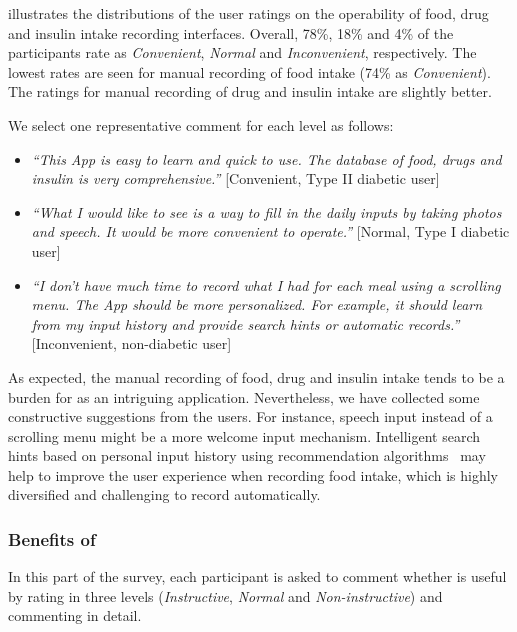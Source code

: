 { illustrates the distributions of the user ratings on the operability of food, drug and insulin intake recording interfaces.
Overall, 78\%, 18\% and 4\% of the participants rate \sysname as \textit{Convenient}, \textit{Normal} and \textit{Inconvenient}, respectively.
The lowest rates are seen for manual recording of food intake (74\% as \textit{Convenient}).
The ratings for manual recording of drug and insulin intake are slightly better.

We select one representative comment for each level as follows:
\begin{itemize}
  \item
  \textit{``This App is easy to learn and quick to use.
  The database of food, drugs and insulin is very comprehensive.''}
  [Convenient, Type II diabetic user]
  \item
  \textit{``What I would like to see is a way to fill in the daily inputs by taking photos and speech.
  It would be more convenient to operate.''}
  [Normal, Type I diabetic user]
  \item
  \textit{``I don't have much time to record what I had for each meal using a scrolling menu.
  The App should be more personalized.
  For example, it should learn from my input history and provide search hints or automatic records.''}
  [Inconvenient, non-diabetic user]
\end{itemize}

As expected, the manual recording of food, drug and insulin intake tends to be a burden for \sysname as an intriguing application.
Nevertheless, we have collected some constructive suggestions from the users.
For instance, speech input instead of a scrolling menu might be a more welcome input mechanism.
Intelligent search hints based on personal input history using recommendation algorithms~\cite{bib:fu2000mining} may help to improve the user experience when recording food intake, which is highly diversified and challenging to record automatically.

\subsubsection{Benefits of \sysname}
In this part of the survey, each participant is asked to comment whether \sysname is useful by rating \sysname in three levels (\textit{Instructive}, \textit{Normal} and \textit{Non-instructive}) and commenting in detail.

}
